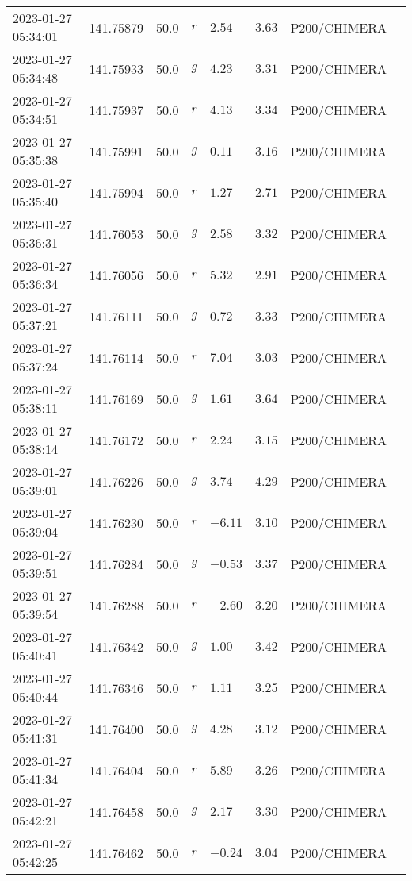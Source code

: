 \documentclass{nature_plusfigure}
\begin{document}
\begin{supplement}
\begin{center}
\begin{longtable}{llllllll}
2023-01-27 05:34:01 & 141.75879 & 50.0 & $r$ & $2.54$ & $3.63$ & P200/CHIMERA &  \\ 
2023-01-27 05:34:48 & 141.75933 & 50.0 & $g$ & $4.23$ & $3.31$ & P200/CHIMERA &  \\ 
2023-01-27 05:34:51 & 141.75937 & 50.0 & $r$ & $4.13$ & $3.34$ & P200/CHIMERA &  \\ 
2023-01-27 05:35:38 & 141.75991 & 50.0 & $g$ & $0.11$ & $3.16$ & P200/CHIMERA &  \\ 
2023-01-27 05:35:40 & 141.75994 & 50.0 & $r$ & $1.27$ & $2.71$ & P200/CHIMERA &  \\ 
2023-01-27 05:36:31 & 141.76053 & 50.0 & $g$ & $2.58$ & $3.32$ & P200/CHIMERA &  \\ 
2023-01-27 05:36:34 & 141.76056 & 50.0 & $r$ & $5.32$ & $2.91$ & P200/CHIMERA &  \\ 
2023-01-27 05:37:21 & 141.76111 & 50.0 & $g$ & $0.72$ & $3.33$ & P200/CHIMERA &  \\ 
2023-01-27 05:37:24 & 141.76114 & 50.0 & $r$ & $7.04$ & $3.03$ & P200/CHIMERA &  \\ 
2023-01-27 05:38:11 & 141.76169 & 50.0 & $g$ & $1.61$ & $3.64$ & P200/CHIMERA &  \\ 
2023-01-27 05:38:14 & 141.76172 & 50.0 & $r$ & $2.24$ & $3.15$ & P200/CHIMERA &  \\ 
2023-01-27 05:39:01 & 141.76226 & 50.0 & $g$ & $3.74$ & $4.29$ & P200/CHIMERA &  \\ 
2023-01-27 05:39:04 & 141.76230 & 50.0 & $r$ & $-6.11$ & $3.10$ & P200/CHIMERA &  \\ 
2023-01-27 05:39:51 & 141.76284 & 50.0 & $g$ & $-0.53$ & $3.37$ & P200/CHIMERA &  \\ 
2023-01-27 05:39:54 & 141.76288 & 50.0 & $r$ & $-2.60$ & $3.20$ & P200/CHIMERA &  \\ 
2023-01-27 05:40:41 & 141.76342 & 50.0 & $g$ & $1.00$ & $3.42$ & P200/CHIMERA &  \\ 
2023-01-27 05:40:44 & 141.76346 & 50.0 & $r$ & $1.11$ & $3.25$ & P200/CHIMERA &  \\ 
2023-01-27 05:41:31 & 141.76400 & 50.0 & $g$ & $4.28$ & $3.12$ & P200/CHIMERA &  \\ 
2023-01-27 05:41:34 & 141.76404 & 50.0 & $r$ & $5.89$ & $3.26$ & P200/CHIMERA &  \\ 
2023-01-27 05:42:21 & 141.76458 & 50.0 & $g$ & $2.17$ & $3.30$ & P200/CHIMERA &  \\ 
2023-01-27 05:42:25 & 141.76462 & 50.0 & $r$ & $-0.24$ & $3.04$ & P200/CHIMERA &  \\ 

\end{longtable}
\end{center}
\end{supplement}
\end{document}
